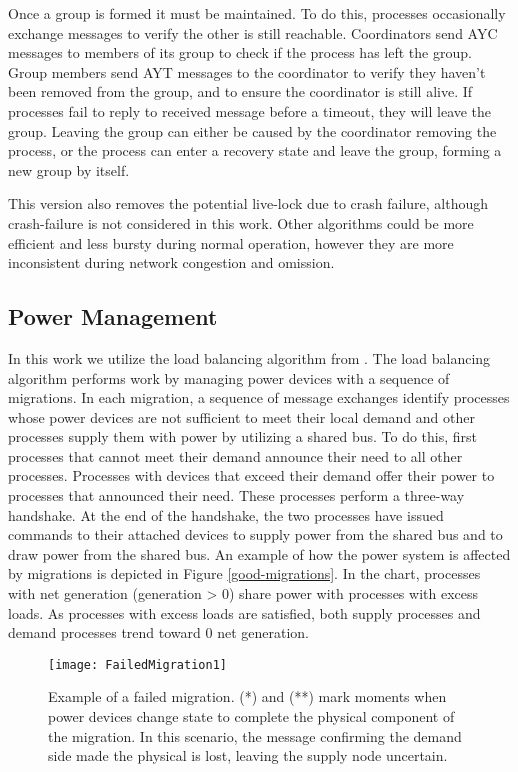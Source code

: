 Once a group is formed it must be maintained.
To do this, processes occasionally exchange messages to verify the other is still reachable.
Coordinators send \ac{AYC} messages to members of its group to check if the process has left the group.
Group members send \ac{AYT} messages to the coordinator to verify they haven't been removed from the group, and to ensure the coordinator is still alive.
If processes fail to reply to received message before a timeout, they will leave the group.
Leaving the group can either be caused by the coordinator removing the process, or the process can enter a recovery state and leave the group, forming a new group by itself.

This version also removes the potential live-lock due to crash failure, although crash-failure is not considered in this work.
Other algorithms could be more efficient and less bursty during normal operation, however they are more inconsistent during network congestion and omission.

\subsection{Power Management}

In this work we utilize the load balancing algorithm from \cite{LOADBALANCING}.
The load balancing algorithm performs work by managing power devices with a sequence of migrations\cite{HILTESTBED}.
In each migration, a sequence of message exchanges identify processes whose power devices are not sufficient to meet their local demand and other processes supply them with power by utilizing a shared bus.
To do this, first processes that cannot meet their demand announce their need to all other processes.
Processes with devices that exceed their demand offer their power to processes that announced their need.
These processes perform a three-way handshake.
At the end of the handshake, the two processes have issued commands to their attached devices to supply power from the shared bus and to draw power from the shared bus.
An example of how the power system is affected by migrations is depicted in Figure \ref{good-migrations}.
In the chart, processes with net generation (generation > 0) share power with processes with excess loads.
As processes with excess loads are satisfied, both supply processes and demand processes trend toward 0 net generation.

\begin{figure}
\centering
\texttt{[image: FailedMigration1]}
\caption{Example of a failed migration. (*) and (**) mark moments when power devices change state to complete the physical component of the migration. In this scenario, the message confirming the demand side made the physical is lost, leaving the supply node uncertain.}
\label{fig:failed-migration-1}
\end{figure}

